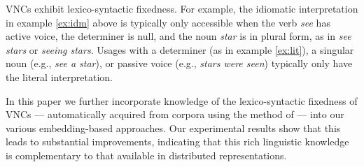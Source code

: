 \documentclass[11pt,a4paper]{article}
\begin{document}
VNCs exhibit lexico-syntactic fixedness. For example, the idiomatic
interpretation in example \ref{ex:idm} above is typically only
accessible when the verb \emph{see} has active voice, the determiner
is null, and the noun \emph{star} is in plural form, as in \emph{see
  stars} or \emph{seeing stars}.  Usages with a determiner (as in
example \ref{ex:lit}), a singular noun (e.g., \emph{see a star}), or
passive voice (e.g., \emph{stars were seen}) typically only have the
literal interpretation.



In this paper we further incorporate knowledge of the lexico-syntactic
fixedness of VNCs --- automatically acquired from corpora using the
method of  --- into our various embedding-based
approaches. Our experimental results show that this leads to
substantial improvements, indicating that this rich linguistic
knowledge is complementary to that available in distributed
representations.




\end{document}

